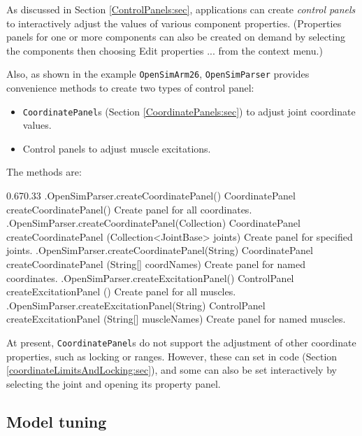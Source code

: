 As discussed in Section \ref{ControlPanels:sec}, applications can create {\it
control panels} to interactively adjust the values of various component
properties. (Properties panels for one or more components can also be created
on demand by selecting the components then choosing {\sf Edit properties ...}
from the context menu.)

Also, as shown in the example {\tt OpenSimArm26}, {\tt OpenSimParser}
provides convenience methods to create two types of control panel:

\begin{itemize}

\item {\tt CoordinatePanel}s (Section \ref{CoordinatePanels:sec}) to
adjust joint coordinate values.

\item Control panels to adjust muscle excitations.

\end{itemize}

The methods are:
%
\begin{methodtable}{0.67}{0.33}
\midline
%
\methodentry
{\osim.OpenSimParser.createCoordinatePanel()}%
{CoordinatePanel createCoordinatePanel()}%
{Create panel for all coordinates.}%
%
\methodentry
{\osim.OpenSimParser.createCoordinatePanel(Collection)}%
{CoordinatePanel createCoordinatePanel (Collection<JointBase> joints)}%
{Create panel for specified joints.}%
%
\methodentry
{\osim.OpenSimParser.createCoordinatePanel(String)}%
{CoordinatePanel createCoordinatePanel (String[] coordNames)}%
{Create panel for named coordinates.}%
%
\methodspace{0.5em}%
\methodentry
{\osim.OpenSimParser.createExcitationPanel()}%
{ControlPanel createExcitationPanel ()}%
{Create panel for all muscles.}%
%
\methodentry
{\osim.OpenSimParser.createExcitationPanel(String)}%
{ControlPanel createExcitationPanel (String[] muscleNames)}%
{Create panel for named muscles.}%
%
\midline
\end{methodtable}
%
\begin{sideblock}
At present, {\tt CoordinatePanel}s do not support the adjustment of other
coordinate properties, such as locking or ranges. However, these can set in
code (Section \ref{coordinateLimitsAndLocking:sec}), and some
can also be set interactively by selecting the joint and
opening its property panel.
\end{sideblock}

\subsection{Model tuning}

